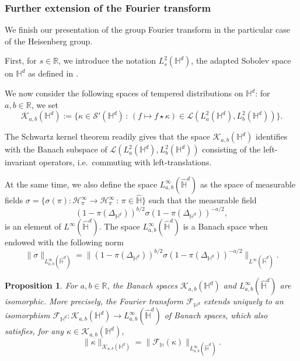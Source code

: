 \documentclass[12pt,a4paper]{amsart}
\theoremstyle{plain}
\newtheorem{proposition}[theorem]{Proposition}
\theoremstyle{definition}
\theoremstyle{remark}
\numberwithin{equation}{section}
\theoremstyle{definition}
\def\R{{\mathbb R}}%
\def \cK{\mathcal{K}}
\def \cS{\mathcal{S}}
\def \Heis{\mathbb{H}}
\def \Hhat{\widehat{\Heis}}
\def \cH{\mathcal{H}}
\def \cF{\mathcal{F}}
\numberwithin{equation}{section}
\begin{document}
\subsubsection{Further extension of the Fourier transform}
\label{subsubsect:extensionFourier}

We finish our presentation of the group Fourier transform in the particular case of the Heisenberg group.

First, for $s\in\R$, we introduce the notation $L_s^2(\Heis^d)$, the adapted Sobolev space on $\Heis^d$ as defined in \cite[Section 4.4]{FR}.

We now consider the following spaces of tempered distributions on $\Heis^d$: for $a,b \in\R$, we set
\begin{equation*}
    \cK_{a,b}(\Heis^d) := \{\kappa\in\cS'(\Heis^d)\,:\,(f\mapsto f\star \kappa)\in\mathcal{L}(L_{a}^2(\Heis^d),L_{b}^2(\Heis^d))\}.
\end{equation*}

The Schwartz kernel theorem readily gives that the space $\cK_{a,b}(\Heis^d)$ identifies with the Banach subspace of $\mathcal{L}(L_{a}^2(\Heis^d),L_{b}^2(\Heis^d))$ consisting of the left-invariant operators, i.e.~commuting with left-translations.

At the same time, we also define the space $L_{a,b}^\infty(\Hhat^d)$ as the space of measurable fields $\sigma = \{\sigma(\pi): \cH_{\pi}^{\infty}\rightarrow \cH_{\pi}^{\infty}\,:\,\pi\in\Hhat\}$ such that the measurable field
\begin{equation*}
    \left(1-\pi(\Delta_{\Heis^d})\right)^{b/2} \sigma \left(1-\pi(\Delta_{\Heis^d})\right)^{-a/2},
\end{equation*}
is an element of $L^\infty(\Hhat^d)$. The space $L_{a,b}^\infty(\Hhat^d)$ is a Banach space when endowed with the following norm
\begin{equation*}
    \|\sigma\|_{L_{a,b}^\infty(\Hhat^d)} = \| \left(1-\pi(\Delta_{\Heis^d})\right)^{b/2} \sigma \left(1-\pi(\Delta_{\Heis^d})\right)^{-a/2}\|_{L^\infty(\Hhat^d)}.
\end{equation*}

\begin{proposition}
    For $a,b\in\R$, the Banach spaces $\cK_{a,b}(\Heis^d)$ and $L_{a,b}^\infty(\Hhat^d)$ are isomorphic. More precisely, the Fourier transform $\cF_{\Heis^d}$ extends uniquely to an isomorphism $\cF_{\Heis^d}: \cK_{a,b}(\Heis^d) \rightarrow L_{a,b}^\infty(\Hhat^d)$ of Banach spaces, which also satisfies, for any $\kappa\in\cK_{a,b}(\Heis^d)$,
    \begin{equation*}
        \|\kappa\|_{\cK_{a,b}(\Heis^d)} = \|\cF_\Heis(\kappa)\|_{L_{a,b}^\infty(\Hhat^d)}.
    \end{equation*}
\end{proposition}
\end{document}
